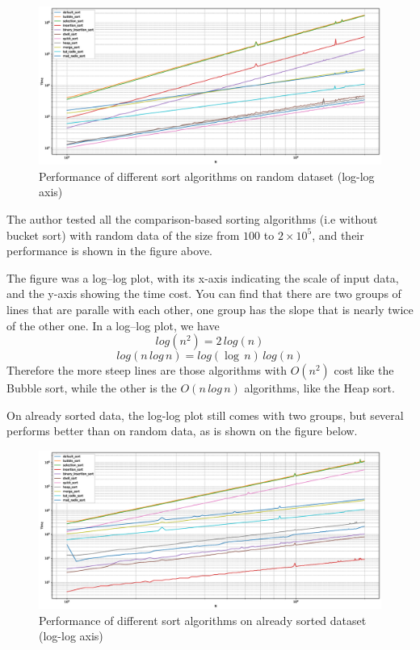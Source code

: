 \documentclass[cn,black,12pt,normal]{elegantnote}
\begin{document}
\begin{figure}[H]
    \centering
    \includegraphics[width=1.0\linewidth]{image/random.eps}
    \caption{Performance of different sort algorithms on random dataset (log-log axis)}
\end{figure}
The author tested all the comparison-based sorting algorithms (i.e without bucket sort) with random data of the size from $100$ to $2\times10^5$, and their performance is shown in the figure above.

The figure was a log–log plot, with its x-axis indicating the scale of input data, and the y-axis showing the time cost. You can find that there are two groups of lines that are paralle with each other, one group has the slope that is nearly twice of the other one. In a log–log plot, we have
\begin{equation*}
    log(n^2) = 2\,log(n)
\end{equation*}
\begin{equation*}
    log(n\,log\,n) = log(\log\,n)\,log(n)
\end{equation*}
Therefore the more steep lines are those algorithms with $O(n^2)$ cost like the Bubble sort, while the other is the $O(n\, log\, n)$ algorithms, like the Heap sort. 

On already sorted data, the log-log plot still comes with two groups, but several performs better than on random data, as is shown on the figure below.
\begin{figure}[H]
    \centering
    \includegraphics[width=1.0\linewidth]{image/sorted.eps}
    \caption{Performance of different sort algorithms on already sorted dataset (log-log axis)}
\end{figure}
\end{document}

